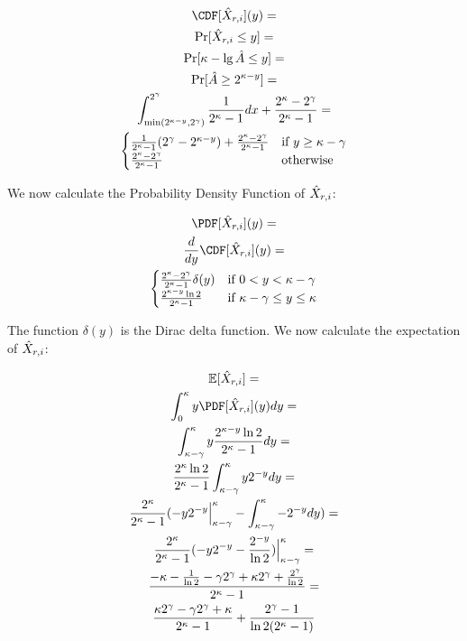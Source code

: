 \begin{gather*}
  \CDF[\HX_{r, i}](y) = \\
  \Pr[\HX_{r, i} \leq y] = \\
  \Pr[\kappa - \lg \hat A \leq y] = \\
  \Pr[\hat A \geq 2^{\kappa - y}] = \\
  \int_{\min(2^{\kappa - y}, 2^\gamma)}^{2^\gamma}{\frac{1}{2^\kappa - 1} dx} + \frac{2^\kappa - 2^\gamma}{2^\kappa - 1} = \\
  \begin{cases}
    \frac{1}{2^\kappa - 1}(2^\gamma - 2^{\kappa - y}) + \frac{2^\kappa - 2^\gamma}{2^\kappa - 1} & \text{if } y \geq \kappa - \gamma \\
    \frac{2^\kappa - 2^\gamma}{2^\kappa - 1} & \text{otherwise}
  \end{cases}
\end{gather*}

We now calculate the Probability Density Function of $\hat X_{r, i}$:

\begin{gather*}
  \PDF[\HX_{r, i}](y) = \\
  \frac{d}{dy}\CDF[\HX_{r, i}](y) = \\
  \begin{cases}
    \frac{2^\kappa - 2^\gamma}{2^\kappa - 1} \delta(y) & \text{if } 0 < y < \kappa - \gamma \\
    \frac{2^{\kappa - y} \ln 2}{2^\kappa - 1} & \text{if } \kappa - \gamma \leq y \leq \kappa
  \end{cases}
\end{gather*}

The function $\delta(y)$ is the Dirac delta function. We now calculate
the expectation of $\hat X_{r, i}$:

\begin{gather*}
  \E[\HX_{r, i}] = \\
  \int_{0}^{\kappa} y \PDF[\HX_{r, i}](y) dy = \\
  \int_{\kappa - \gamma}^{\kappa}{y \frac{2^{\kappa - y} \ln 2}{2^\kappa - 1} dy} = \\
  \frac{2^\kappa \ln 2}{2^\kappa - 1} \int_{\kappa - \gamma}^{\kappa}{y 2^{- y} dy} = \\
  \frac{2^\kappa}{2^\kappa - 1} (-y 2^{-y}\Big|_{\kappa - \gamma}^{\kappa} - \int_{\kappa - \gamma}^{\kappa}{-2^{- y} dy}) = \\
  \frac{2^\kappa}{2^\kappa - 1} (-y 2^{-y} - \frac{2^{-y}}{\ln 2}) \Big|_{\kappa - \gamma}^{\kappa} = \\
  \frac{-\kappa - \frac{1}{\ln2} - \gamma 2^\gamma + \kappa 2^\gamma + \frac{2^\gamma}{\ln 2}}{2^\kappa - 1} = \\
  \frac{\kappa 2^\gamma - \gamma 2^\gamma + \kappa}{2^\kappa - 1} + \frac{2^\gamma - 1}{\ln 2 (2^\kappa - 1)}
\end{gather*}

